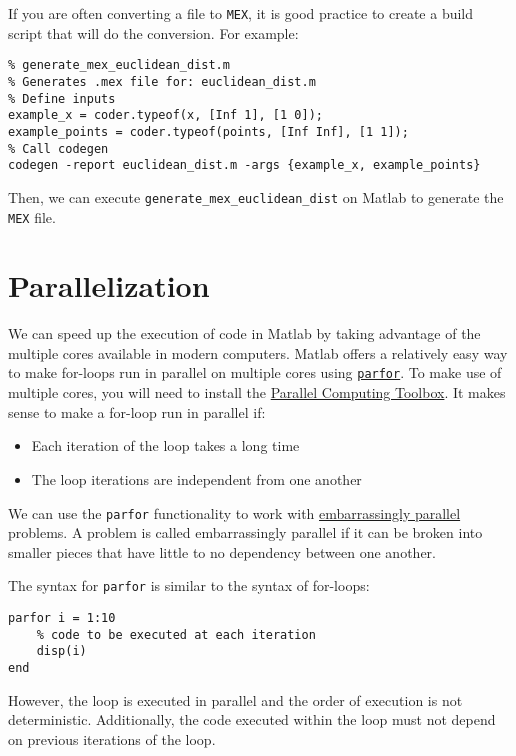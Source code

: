 \documentclass[12pt, a4paper]{article}
\begin{document}
If you are often converting a file to \texttt{MEX}, it is good practice to create a build script that will do the conversion.
For example:
\lstset{language=matlab,label= ,caption= ,captionpos=b,firstnumber=1,numbers=left,style=Matlab-editor}
\begin{lstlisting}
% generate_mex_euclidean_dist.m
% Generates .mex file for: euclidean_dist.m
% Define inputs
example_x = coder.typeof(x, [Inf 1], [1 0]);
example_points = coder.typeof(points, [Inf Inf], [1 1]);
% Call codegen
codegen -report euclidean_dist.m -args {example_x, example_points}
\end{lstlisting}
Then, we can execute \texttt{generate\_mex\_euclidean\_dist} on Matlab to generate the \texttt{MEX} file.
\section{Parallelization}
\label{sec:org4d040ac}
We can speed up the execution of code in Matlab by taking advantage of the multiple cores available in modern computers.
Matlab offers a relatively easy way to make for-loops run in parallel on multiple cores using \href{https://www.mathworks.com/help/parallel-computing/parfor.html}{\texttt{parfor}}.
To make use of multiple cores, you will need to install the \href{https://www.mathworks.com/products/parallel-computing.html}{Parallel Computing Toolbox}.
It makes sense to make a for-loop run in parallel if:
\begin{itemize}
\item Each iteration of the loop takes a long time
\item The loop iterations are independent from one another
\end{itemize}
We can use the \texttt{parfor} functionality to work with \href{https://en.wikipedia.org/wiki/Embarrassingly\_parallel}{embarrassingly parallel} problems.
A problem is called embarrassingly parallel if it can be broken into smaller pieces that have little to no dependency between one another.

The syntax for \texttt{parfor} is similar to the syntax of for-loops:
\lstset{language=matlab,label= ,caption= ,captionpos=b,firstnumber=1,numbers=left,style=Matlab-editor}
\begin{lstlisting}
parfor i = 1:10
    % code to be executed at each iteration
    disp(i)
end
\end{lstlisting}
However, the loop is executed in parallel and the order of execution is not deterministic.
Additionally, the code executed within the loop must not depend on previous iterations of the loop.
\end{document}
